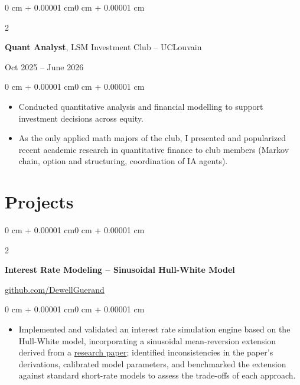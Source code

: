 \documentclass[10pt, letterpaper]{article}
\newenvironment{highlights}{
    \begin{itemize}[
        topsep=0.06 cm,
        parsep=0.06 cm,
        partopsep=0pt,
        itemsep=0pt,
        leftmargin=0 cm + 10pt
    ]
}{
    \end{itemize}
}
\newenvironment{onecolentry}{
    \begin{adjustwidth}{0 cm + 0.00001 cm}{0 cm + 0.00001 cm}
}{
    \end{adjustwidth}
}
\newenvironment{twocolentry}[2][]{
    \onecolentry
    \def\secondColumn{#2}
    \setcolumnwidth{\fill, 4.5 cm}
    \begin{paracol}{2}
}{
    \switchcolumn \raggedleft \secondColumn
    \end{paracol}
    \endonecolentry
}
\begin{document}
        \begin{twocolentry}{Oct 2025 – June 2026}
            \textbf{Quant Analyst}, LSM Investment Club -- UCLouvain
        \end{twocolentry}
        \vspace{0.06 cm}
        \begin{onecolentry}
            \begin{highlights}
                \item Conducted quantitative analysis and financial modelling to support investment decisions across equity.
                \item As the only applied math majors of the club, I presented and popularized recent academic research in quantitative finance to club members (Markov chain, option and structuring, coordination of IA agents).
            \end{highlights}
        \end{onecolentry}

    \section{Projects}

        \begin{twocolentry}{\href{https://github.com/DewellGuerand}{github.com/DewellGuerand}}
            \textbf{Interest Rate Modeling -- Sinusoidal Hull-White Model}
        \end{twocolentry}
        \vspace{0.06 cm}
        \begin{onecolentry}
            \begin{highlights}
                \item Implemented and validated an interest rate simulation engine based on the Hull-White model, incorporating a sinusoidal mean-reversion extension derived from a \href{https://arxiv.org/abs/2506.06317v1}{research paper}; identified inconsistencies in the paper's derivations, calibrated model parameters, and benchmarked the extension against standard short-rate models to assess the trade-offs of each approach.
            \end{highlights}
        \end{onecolentry}

        \vspace{0.06 cm}
\end{document}
